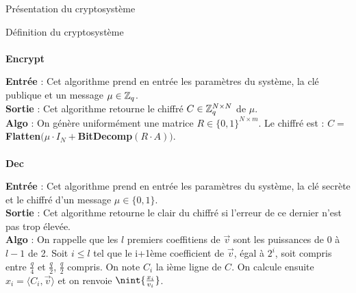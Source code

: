 \begin{section}{Présentation du cryptosystème}
\begin{subsection}{Définition du cryptosystème}
	\paragraph{}
	\textbf{Encrypt}
	\flushleft
	
	\textbf{Entrée} : Cet algorithme prend en entrée les paramètres du système, la clé publique et un message $\mu \in \mathbb{Z}_q$. \\
	\textbf{Sortie} : Cet algorithme retourne le chiffré $C \in \mathbb{Z}_q^{N \times N}$ de $\mu$.\\
	\textbf{Algo} : On génère uniformément une matrice $R \in \{ 0,1\} ^{N \times m}$. Le chiffré est : $C = $ \textbf{Flatten}$(\mu \cdot I_N + $\textbf{BitDecomp}$(R \cdot A))$.
	
	\paragraph{}
	\textbf{Dec}
	\flushleft
	
	\textbf{Entrée} : Cet algorithme prend en entrée les paramètres du système, la clé secrète et le chiffré d'un message $\mu \in \{ 0,1\} $. \\
	\textbf{Sortie} : Cet algorithme retourne le clair du chiffré si l'erreur de ce dernier n'est pas trop élevée.\\
	\textbf{Algo} : On rappelle que les $l$ premiers coeffitiens de $\vec{v}$ sont les puissances de 0 à $l-1$ de 2. Soit $i \leqslant l$ tel que le i+1ème coefficient de $\vec{v}$, égal à $2^{i}$, soit compris entre $\frac{q}{4}$ et $\frac{q}{2}$, $\frac{q}{2}$ compris. On note $C_i$ la ième ligne de $C$. On calcule ensuite $x_i = \langle C_i, \vec{v} \rangle$ et on renvoie $\nint{\frac{x_i}{v_i}}$.
	\end{subsection}
\end{section}
